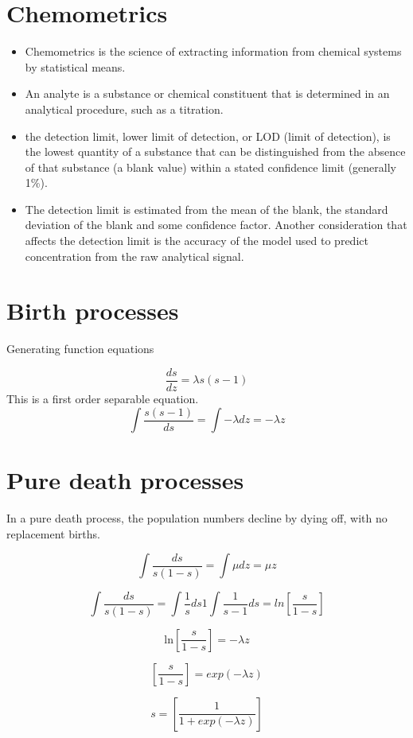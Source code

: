 \section{Chemometrics}
\begin{itemize}
	\item  Chemometrics is the science of extracting information from chemical systems by statistical means.
	\item An analyte is a substance or chemical constituent that is determined in an analytical procedure, such as a titration.
	\item the detection limit, lower limit of detection, or LOD (limit of detection), is the lowest quantity of a substance that can be distinguished from the absence of that substance (a blank value) within a stated confidence limit (generally 1\%).
	\item The detection limit is estimated from the mean of the blank, the standard deviation of the blank and some confidence factor. Another consideration that affects the detection limit is the accuracy of the model used to predict concentration from the raw analytical signal.
	
\end{itemize}



\section{Birth processes}
Generating function equations

\[
\frac{ds}{dz} = \lambda s(s-1)
\]
This is a first order separable equation.
\[
\int \frac{s(s-1)}{ds} = \int -\lambda dz = -\lambda z
\]


\section{Pure death processes}
In a pure death process, the population numbers decline by dying
off, with no replacement births.

\[ \int \frac{ds}{s(1-s)} = \int \mu dz = \mu z \]


\[ \int \frac{ds}{s(1-s)} = \int \frac{1}{s} ds 1 \int
\frac{1}{s-1}ds= ln \left[\frac{s}{1-s} \right]
\]

\[  \mbox{ln} \left[\frac{s}{1-s} \right] = -\lambda z
\]

\[  \left[\frac{s}{1-s} \right] = exp(-\lambda z)
\]

\[  s = \left[\frac{1}{1+exp(-\lambda z)} \right]
\]

